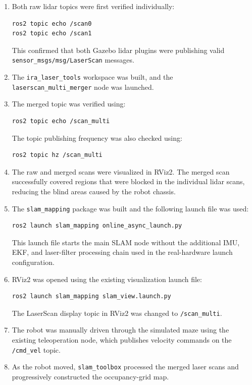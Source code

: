 \documentclass{article}
\begin{document}
\begin{enumerate}
    \item Both raw lidar topics were first verified individually:

\begin{verbatim}
ros2 topic echo /scan0
ros2 topic echo /scan1
\end{verbatim}

    This confirmed that both Gazebo lidar plugins were publishing valid
    \texttt{sensor\_msgs/msg/LaserScan} messages.

    \item The \texttt{ira\_laser\_tools} workspace was built, and the
    \texttt{laserscan\_multi\_merger} node was launched.

    \item The merged topic was verified using:

\begin{verbatim}
ros2 topic echo /scan_multi
\end{verbatim}

    The topic publishing frequency was also checked using:

\begin{verbatim}
ros2 topic hz /scan_multi
\end{verbatim}

    \item The raw and merged scans were visualized in RViz2. The merged scan
    successfully covered regions that were blocked in the individual lidar
    scans, reducing the blind areas caused by the robot chassis.

    \item The \texttt{slam\_mapping} package was built and the following
    launch file was used:

\begin{verbatim}
ros2 launch slam_mapping online_async_launch.py
\end{verbatim}

    This launch file starts the main SLAM node without the additional IMU,
    EKF, and laser-filter processing chain used in the real-hardware launch
    configuration.

    \item RViz2 was opened using the existing visualization launch file:

\begin{verbatim}
ros2 launch slam_mapping slam_view.launch.py
\end{verbatim}

    The LaserScan display topic in RViz2 was changed to
    \texttt{/scan\_multi}.

    \item The robot was manually driven through the simulated maze using the
    existing teleoperation node, which publishes velocity commands on the
    \texttt{/cmd\_vel} topic.

    \item As the robot moved, \texttt{slam\_toolbox} processed the merged
    laser scans and progressively constructed the occupancy-grid map.
\end{enumerate}
\end{document}
